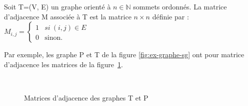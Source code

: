 \begin{defi}\label{def-adjmatrice}
Soit T=(V, E) un graphe orienté à $n \in \mathbb{N}$ sommets ordonnés. La matrice d'adjacence M associée à T est la matrice $n \times n$ définie par : 
$M_{i, j} = \left\{
  \begin{array}{ll}
	  1 & si\ (i, j) \in E
	\\0 & \mbox{sinon.}
  \end{array}
\right.
$
\end{defi}

Par exemple, les graphe P et T de la figure \ref{fig:ex-graphe-sg} ont pour matrice d'adjacence les matrices de la figure~\ref{fig:mat-adj}. 


\begin{figure}[ht]
\begin{center}
  \quad
  \\
\end{center}
\caption{Matrices d'adjacence des graphes T et P}
\label{fig:mat-adj}
\end{figure}

